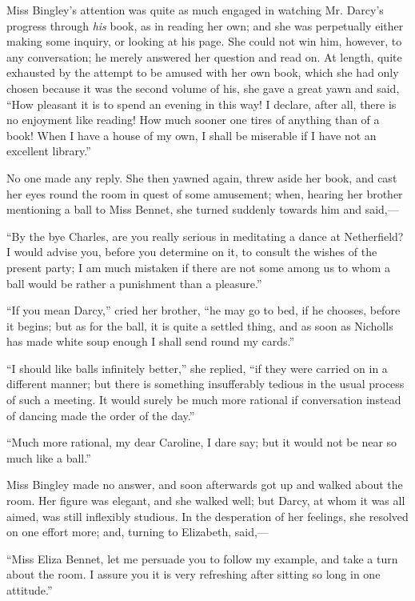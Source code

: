 \documentclass[12pt]{book}
\begin{document}
Miss Bingley's attention was quite as much engaged in watching Mr. Darcy's progress through \textit{his} book, as in reading her own; and she was perpetually either making some inquiry, or looking at his page. She could not win him, however, to any conversation; he merely answered her question and read on. At length, quite exhausted by the attempt to be amused with her own book, which she had only chosen because it was the second volume of his, she gave a great yawn and said, ``How pleasant it is to spend an evening in this way! I declare, after all, there is no enjoyment like reading! How much sooner one tires of anything than of a book! When I have a house of my own, I shall be miserable if I have not an excellent library.''

No one made any reply. She then yawned again, threw aside her book, and cast her eyes round the room in quest of some amusement; when, hearing her brother mentioning a ball to Miss Bennet, she turned suddenly towards him and said,---

``By the bye Charles, are you really serious in meditating a dance at Netherfield? I would advise you, before you determine on it, to consult the wishes of the present party; I am much mistaken if there are not some among us to whom a ball would be rather a punishment than a pleasure.''

``If you mean Darcy,'' cried her brother, ``he may go to bed, if he chooses, before it begins; but as for the ball, it is quite a settled thing, and as soon as Nicholls has made white soup enough I shall send round my cards.''

``I should like balls infinitely better,'' she replied, ``if they were carried on in a different manner; but there is something insufferably tedious in the usual process of such a meeting. It would surely be much more rational if conversation instead of dancing made the order of the day.''

``Much more rational, my dear Caroline, I dare say; but it would not be near so much like a ball.''

Miss Bingley made no answer, and soon afterwards got up and walked about the room. Her figure was elegant, and she walked well; but Darcy, at whom it was all aimed, was still inflexibly studious. In the desperation of her feelings, she resolved on one effort more; and, turning to Elizabeth, said,---

``Miss Eliza Bennet, let me persuade you to follow my example, and take a turn about the room. I assure you it is very refreshing after sitting so long in one attitude.''
\end{document}
